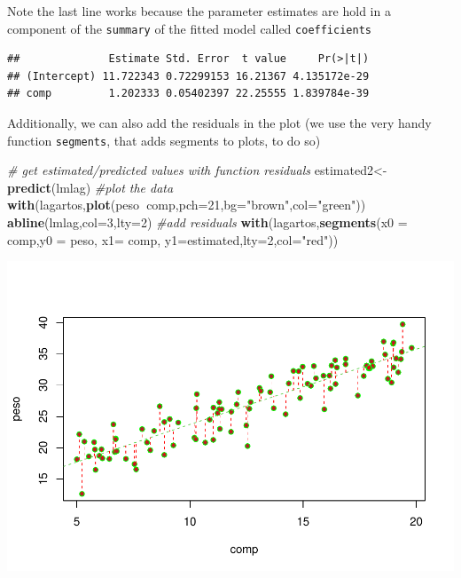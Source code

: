 \documentclass[
]{book}
\newenvironment{Shaded}{\begin{snugshade}}{\end{snugshade}}
\newcommand{\CommentTok}[1]{\textcolor[rgb]{0.56,0.35,0.01}{\textit{#1}}}
\newcommand{\DataTypeTok}[1]{\textcolor[rgb]{0.13,0.29,0.53}{#1}}
\newcommand{\DecValTok}[1]{\textcolor[rgb]{0.00,0.00,0.81}{#1}}
\newcommand{\KeywordTok}[1]{\textcolor[rgb]{0.13,0.29,0.53}{\textbf{#1}}}
\newcommand{\NormalTok}[1]{#1}
\newcommand{\OperatorTok}[1]{\textcolor[rgb]{0.81,0.36,0.00}{\textbf{#1}}}
\newcommand{\StringTok}[1]{\textcolor[rgb]{0.31,0.60,0.02}{#1}}
\begin{document}
Note the last line works because the parameter estimates are hold in a component of the \texttt{summary} of the fitted model called \texttt{coefficients}

\begin{Shaded}
\end{Shaded}

\begin{verbatim}
##              Estimate Std. Error  t value     Pr(>|t|)
## (Intercept) 11.722343 0.72299153 16.21367 4.135172e-29
## comp         1.202333 0.05402397 22.25555 1.839784e-39
\end{verbatim}

Additionally, we can also add the residuals in the plot (we use the very handy function \texttt{segments}, that adds segments to plots, to do so)

\begin{Shaded}
\begin{Highlighting}[]
\CommentTok{# get estimated/predicted values with function residuals}
\NormalTok{estimated2<-}\KeywordTok{predict}\NormalTok{(lmlag)}
\CommentTok{#plot the data}
\KeywordTok{with}\NormalTok{(lagartos,}\KeywordTok{plot}\NormalTok{(peso}\OperatorTok{~}\NormalTok{comp,}\DataTypeTok{pch=}\DecValTok{21}\NormalTok{,}\DataTypeTok{bg=}\StringTok{"brown"}\NormalTok{,}\DataTypeTok{col=}\StringTok{"green"}\NormalTok{))}
\KeywordTok{abline}\NormalTok{(lmlag,}\DataTypeTok{col=}\DecValTok{3}\NormalTok{,}\DataTypeTok{lty=}\DecValTok{2}\NormalTok{)}
\CommentTok{#add residuals}
\KeywordTok{with}\NormalTok{(lagartos,}\KeywordTok{segments}\NormalTok{(}\DataTypeTok{x0 =}\NormalTok{ comp,}\DataTypeTok{y0 =}\NormalTok{ peso, }\DataTypeTok{x1=}\NormalTok{ comp, }\DataTypeTok{y1=}\NormalTok{estimated,}\DataTypeTok{lty=}\DecValTok{2}\NormalTok{,}\DataTypeTok{col=}\StringTok{"red"}\NormalTok{))}
\end{Highlighting}
\end{Shaded}

\includegraphics{ECOMODbook_files/figure-latex/a6.11-1.pdf}
\end{document}

